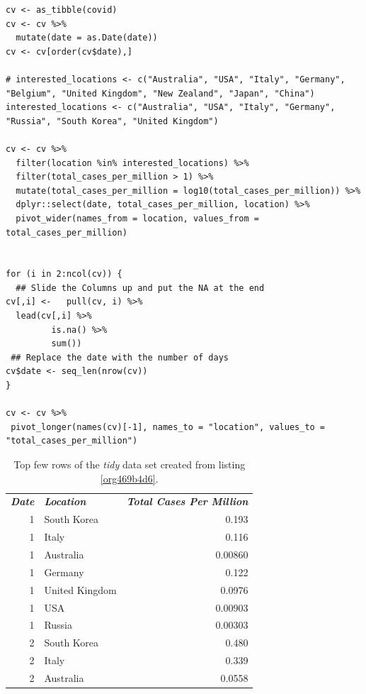 \documentclass[11pt]{article}
\begin{document}
\begin{listing}[htbp]
\begin{verbatim}
cv <- as_tibble(covid)
cv <- cv %>%
  mutate(date = as.Date(date))
cv <- cv[order(cv$date),]

# interested_locations <- c("Australia", "USA", "Italy", "Germany", "Belgium", "United Kingdom", "New Zealand", "Japan", "China")
interested_locations <- c("Australia", "USA", "Italy", "Germany", "Russia", "South Korea", "United Kingdom")

cv <- cv %>%
  filter(location %in% interested_locations) %>%
  filter(total_cases_per_million > 1) %>%
  mutate(total_cases_per_million = log10(total_cases_per_million)) %>%
  dplyr::select(date, total_cases_per_million, location) %>%
  pivot_wider(names_from = location, values_from = total_cases_per_million)


for (i in 2:ncol(cv)) {
  ## Slide the Columns up and put the NA at the end
cv[,i] <-   pull(cv, i) %>%
  lead(cv[,i] %>%
         is.na() %>%
         sum())
 ## Replace the date with the number of days
cv$date <- seq_len(nrow(cv))
}

cv <- cv %>%
 pivot_longer(names(cv)[-1], names_to = "location", values_to = "total_cases_per_million")
\end{verbatim}
\caption{\label{org469b4d6}Use = dplyr= to transform the data as shown in table \ref{tab:org5cf6def}, this can then be passed to ggplot as shown in listing \ref{org19be2d1}}
\end{listing}

\begin{table}[htbp]
\caption{\label{tab:org5cf6def}Top few rows of the \emph{tidy} data set created from listing \ref{org469b4d6}.}
\centering
\begin{tabular}{rlr}
\emph{\textbf{Date}} & \emph{\textbf{Location}} & \emph{\textbf{Total Cases Per Million}}\\
1 & South Korea & 0.193\\
1 & Italy & 0.116\\
1 & Australia & 0.00860\\
1 & Germany & 0.122\\
1 & United Kingdom & 0.0976\\
1 & USA & 0.00903\\
1 & Russia & 0.00303\\
2 & South Korea & 0.480\\
2 & Italy & 0.339\\
2 & Australia & 0.0558\\
\end{tabular}
\end{table}
\end{document}
